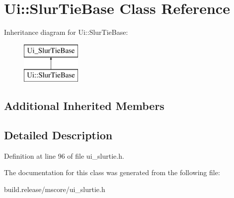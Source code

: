 \hypertarget{class_ui_1_1_slur_tie_base}{}\section{Ui\+:\+:Slur\+Tie\+Base Class Reference}
\label{class_ui_1_1_slur_tie_base}
Inheritance diagram for Ui\+:\+:Slur\+Tie\+Base\+:\begin{figure}[H]
\begin{center}
\leavevmode
\includegraphics[height=2.000000cm]{class_ui_1_1_slur_tie_base}
\end{center}
\end{figure}
\subsection*{Additional Inherited Members}


\subsection{Detailed Description}


Definition at line 96 of file ui\+\_\+slurtie.\+h.



The documentation for this class was generated from the following file\+:\begin{DoxyCompactItemize}
\item 
build.\+release/mscore/ui\+\_\+slurtie.\+h\end{DoxyCompactItemize}
